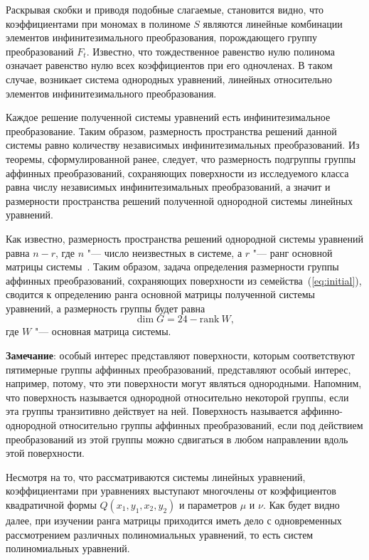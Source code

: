 \documentclass[../main.tex]{subfiles}
\begin{document}
Раскрывая скобки и приводя подобные слагаемые, становится видно, что коэффициентами при мономах в полиноме $S$ являются линейные комбинации элементов инфинитезимального преобразования, порождающего группу преобразований $F_t$. Известно, что тождественное равенство нулю полинома означает равенство нулю всех коэффициентов при его одночленах. В таком случае, возникает система однородных уравнений, линейных относительно элементов инфинитезимального преобразования. 

Каждое решение полученной системы уравнений есть инфинитезимальное преобразование. Таким образом, размерность пространства решений данной системы равно количеству независимых инфинитезимальных преобразований. Из теоремы, сформулированной ранее, следует, что размерность подгруппы группы аффинных преобразований, сохраняющих поверхности из исследуемого класса равна числу независимых инфинитезимальных преобразований, а значит и размерности пространства решений полученной однородной системы линейных уравнений.

Как известно, размерность пространства решений однородной системы уравнений равна $n - r$, где $n$ "--- число неизвестных в системе, а $r$ "--- ранг основной матрицы системы~\cite{costrikin_va1}. Таким образом, задача определения размерности группы аффинных преобразований, сохраняющих поверхности из семейства~(\ref{eq:initial}), сводится к определению ранга основной матрицы полученной системы уравнений, а размерность группы будет равна
\begin{equation}\label{eq:dim_rank}
\dim G = 24 - \mathrm{rank}~W,
\end{equation}
где $W$ "--- основная матрица системы. 

\textbf{Замечание}: особый интерес представляют поверхности, которым соответствуют пятимерные группы аффинных преобразований, представляют особый интерес, например, потому, что эти поверхности могут являться однородными. Напомним, что поверхность называется однородной относительно некоторой группы, если эта группы транзитивно действует на ней. Поверхность называется аффинно-однородной относительно группы аффинных преобразований, если под действием преобразований из этой группы можно сдвигаться в любом направлении вдоль этой поверхности.

Несмотря на то, что рассматриваются системы линейных уравнений, коэффициентами при уравнениях выступают многочлены от коэффициентов квадратичной формы $Q(x_1, y_1, x_2, y_2)$ и параметров $\mu$ и $\nu$. Как будет видно далее, при изучении ранга матрицы приходится иметь дело с одновременных рассмотрением различных полиномиальных уравнений, то есть систем полиномиальных уравнений.  
\end{document}
